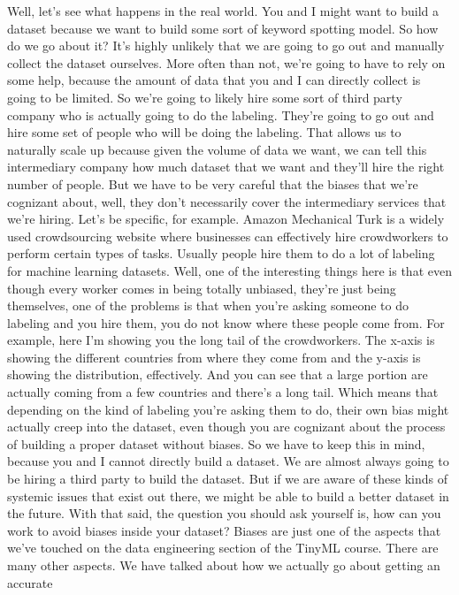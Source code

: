Well, let's see what happens in the real world.
You and I might want to build a dataset because we want to build
some sort of keyword spotting model.
So how do we go about it?
It's highly unlikely that we are going to go out and manually
collect the dataset ourselves.
More often than not, we're going to have to rely on some help,
because the amount of data that you and I can directly collect
is going to be limited.
So we're going to likely hire some sort of third party company who is actually
going to do the labeling.
They're going to go out and hire some set of people
who will be doing the labeling.
That allows us to naturally scale up because given the volume of data
we want, we can tell this intermediary company how much dataset that we want
and they'll hire the right number of people.
But we have to be very careful that the biases that we're
cognizant about, well, they don't necessarily
cover the intermediary services that we're hiring.
Let's be specific, for example.
Amazon Mechanical Turk is a widely used crowdsourcing website
where businesses can effectively hire crowdworkers
to perform certain types of tasks.
Usually people hire them to do a lot of labeling for machine learning datasets.
Well, one of the interesting things here is
that even though every worker comes in being totally unbiased,
they're just being themselves, one of the problems
is that when you're asking someone to do labeling and you hire them,
you do not know where these people come from.
For example, here I'm showing you the long tail of the crowdworkers.
The x-axis is showing the different countries from where they come from
and the y-axis is showing the distribution, effectively.
And you can see that a large portion are actually coming from a few countries
and there's a long tail.
Which means that depending on the kind of labeling you're asking them to do,
their own bias might actually creep into the dataset,
even though you are cognizant about the process of building
a proper dataset without biases.
So we have to keep this in mind, because you and I cannot directly build
a dataset.
We are almost always going to be hiring a third party to build the dataset.
But if we are aware of these kinds of systemic issues that exist out there,
we might be able to build a better dataset in the future.
With that said, the question you should ask yourself
is, how can you work to avoid biases inside your dataset?
Biases are just one of the aspects that we've touched on the data engineering
section of the TinyML course.
There are many other aspects.
We have talked about how we actually go about getting an accurate
